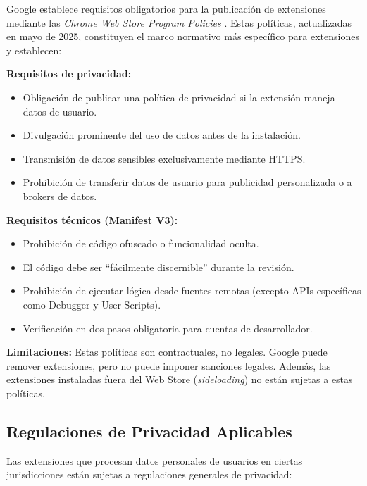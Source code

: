 \documentclass[12pt,oneside]{report}
\begin{document}
Google establece requisitos obligatorios para la publicación de extensiones mediante las \textit{Chrome Web Store Program Policies} \cite{cws_policies}. Estas políticas, actualizadas en mayo de 2025, constituyen el marco normativo más específico para extensiones y establecen:

\textbf{Requisitos de privacidad:}
\begin{itemize}
    \item Obligación de publicar una política de privacidad si la extensión maneja datos de usuario.
    \item Divulgación prominente del uso de datos antes de la instalación.
    \item Transmisión de datos sensibles exclusivamente mediante HTTPS.
    \item Prohibición de transferir datos de usuario para publicidad personalizada o a brokers de datos.
\end{itemize}

\textbf{Requisitos técnicos (Manifest V3):}
\begin{itemize}
    \item Prohibición de código ofuscado o funcionalidad oculta.
    \item El código debe ser ``fácilmente discernible'' durante la revisión.
    \item Prohibición de ejecutar lógica desde fuentes remotas (excepto APIs específicas como Debugger y User Scripts).
    \item Verificación en dos pasos obligatoria para cuentas de desarrollador.
\end{itemize}

\textbf{Limitaciones:} Estas políticas son contractuales, no legales. Google puede remover extensiones, pero no puede imponer sanciones legales. Además, las extensiones instaladas fuera del Web Store (\textit{sideloading}) no están sujetas a estas políticas.

\subsection{Regulaciones de Privacidad Aplicables}

Las extensiones que procesan datos personales de usuarios en ciertas jurisdicciones están sujetas a regulaciones generales de privacidad:
\end{document}
